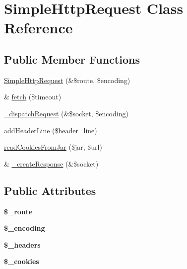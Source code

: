 \hypertarget{class_simple_http_request}{
\section{SimpleHttpRequest Class Reference}
\label{class_simple_http_request}
}
\subsection*{Public Member Functions}
\begin{DoxyCompactItemize}
\item 
\hyperlink{class_simple_http_request_a44123ae07ac9e6dd385b107460e8f4ba}{SimpleHttpRequest} (\&\$route, \$encoding)
\item 
\& \hyperlink{class_simple_http_request_ad343424c442a16dfbe62dddb52b02092}{fetch} (\$timeout)
\item 
\hyperlink{class_simple_http_request_afe234f337f1ac909dc125adb428cfed5}{\_\-dispatchRequest} (\&\$socket, \$encoding)
\item 
\hyperlink{class_simple_http_request_ac0309917a5be6411e7a87fc50fbb4304}{addHeaderLine} (\$header\_\-line)
\item 
\hyperlink{class_simple_http_request_ac5604262cc0cb2dc429b734b8806d64b}{readCookiesFromJar} (\$jar, \$url)
\item 
\& \hyperlink{class_simple_http_request_a5ae5d9eabfbc855f3566d2c24ac8241e}{\_\-createResponse} (\&\$socket)
\end{DoxyCompactItemize}
\subsection*{Public Attributes}
\begin{DoxyCompactItemize}
\item 
\hypertarget{class_simple_http_request_af3911993c66783e1856f17e71f9c4483}{
{\bfseries \$\_\-route}}
\label{class_simple_http_request_af3911993c66783e1856f17e71f9c4483}

\item 
\hypertarget{class_simple_http_request_a764d7f4309070df6f01bc20f56f2aad7}{
{\bfseries \$\_\-encoding}}
\label{class_simple_http_request_a764d7f4309070df6f01bc20f56f2aad7}

\item 
\hypertarget{class_simple_http_request_a54e9738662cefc4852bc7d9f2c70394b}{
{\bfseries \$\_\-headers}}
\label{class_simple_http_request_a54e9738662cefc4852bc7d9f2c70394b}

\item 
\hypertarget{class_simple_http_request_a8d19d5a1fed68d4016496e80f914d1a9}{
{\bfseries \$\_\-cookies}}
\label{class_simple_http_request_a8d19d5a1fed68d4016496e80f914d1a9}

\end{DoxyCompactItemize}


